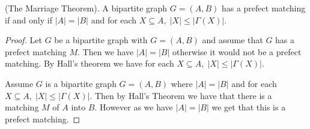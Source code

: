 \documentclass[12pt]{article}
\newenvironment{corollary}[2][Corollary]{\begin{trivlist}
\item[\hskip \labelsep {\bfseries #1}\hskip \labelsep {\bfseries #2.}]}{\end{trivlist}}
\begin{document}
\begin{corollary}
    {1.1.4.}(The Marriage Theorem). A bipartite graph $G=(A,B)$ has a prefect matching if and only if $|A|=|B|$ and for each $X\subseteq A,\; |X|\leq |\Gamma(X)|$.
\end{corollary}
\begin{proof}
    Let $G$ be a bipartite graph with $G=(A,B)$ and assume that $G$ has a prefect matching $M$. Then we have $|A|=|B|$ otherwise it would not be a prefect matching. By Hall's theorem we have for each $X\subseteq A,\; |X|\leq |\Gamma(X)|$.


    Assume $G$ is a bipartite graph $G=(A,B)$ where $|A|=|B|$ and for each $X \subseteq A,\; |X|\leq |\Gamma(X)|$. Then by Hall's Theorem we have that there is a matching $M$ of $A$ into $B$. However as we have $|A|=|B|$ we get that this is a prefect matching.
\end{proof}
\end{document}

